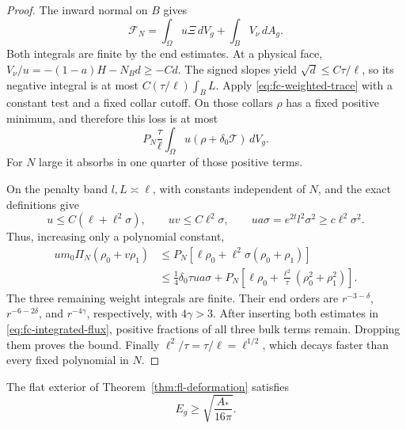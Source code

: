 \begin{proof}
The inward normal on $B$ gives
\begin{equation}\label{eq:fc-integrated-flux}
 \mathcal F_N=\int_\Omega u\Xi\,dV_g+\int_B V_\nu\,dA_g.
\end{equation}
Both integrals are finite by the end estimates.
At a physical face, $V_\nu/u=-(1-a)H-N_Bd\ge-Cd$.
The signed slopes yield $\sqrt d\le C\tau/\ell$, so its negative
integral is at most $C(\tau/\ell)\int_B L$.
Apply \eqref{eq:fc-weighted-trace} with a constant test and a fixed
collar cutoff.  On those collars $\rho$ has a fixed positive
minimum, and therefore this loss is at most
\[
 P_N\frac\tau\ell
            \int_\Omega u(\rho+\delta_0\mathcal T)\,dV_g.
\]
For $N$ large it absorbs in one quarter of those positive terms.

On the penalty band $l,L\asymp\ell$, with constants independent
of $N$, and the exact definitions give
\[
 u\le C(\ell+\ell^2\sigma),\qquad
 uv\le C\ell^2\sigma,\qquad
 ua\sigma=e^{2t}l^2\sigma^2\ge c\ell^2\sigma^2.
\]
Thus, increasing only a polynomial constant,
\begin{align*}
 u m_0\Pi_N(\rho_0+v\rho_1)
 &\le P_N[\ell\rho_0+\ell^2\sigma(\rho_0+\rho_1)]\\
 &\le\tfrac14\delta_0\tau ua\sigma
       +P_N\left[\ell\rho_0+
                \frac{\ell^2}\tau(\rho_0^2+\rho_1^2)\right].
\end{align*}
The three remaining weight integrals are finite.  Their end
orders are $r^{-3-\delta}$, $r^{-6-2\delta}$, and
$r^{-4\gamma}$, respectively, with $4\gamma>3$.
After inserting both estimates in
\eqref{eq:fc-integrated-flux}, positive fractions of all three
bulk terms remain.  Dropping them proves the bound.
Finally $\ell^2/\tau=\tau/\ell=\ell^{1/2}$, which decays faster
than every fixed polynomial in $N$.
\end{proof}

\begin{theorem}
\label{thm:fc-mass-completion}
The flat exterior of Theorem~\ref{thm:fl-deformation} satisfies
\[
 E_g\ge\sqrt{\frac{A_*}{16\pi}}.
\]
\end{theorem}

